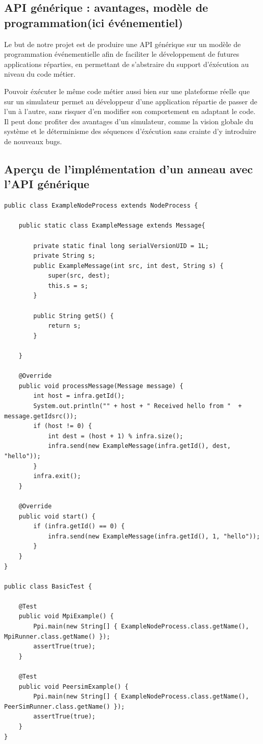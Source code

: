 \documentclass{article}
\begin{document}
			\subsection{API générique : avantages, modèle de programmation(ici événementiel)}
				Le but de notre projet est de produire une API générique sur un modèle de programmation événementielle afin de faciliter le développement de futures applications réparties, en permettant de s'abstraire du support d'éxécution au niveau du code métier. \par
Pouvoir éxécuter le même code métier aussi bien sur une plateforme réelle que sur un simulateur permet au développeur d'une application répartie de passer de l'un à l'autre, sans risquer d'en  modifier son comportement en adaptant le code. \newline Il peut donc profiter des avantages d'un simulateur, comme la vision globale du système et le déterminisme des séquences d'éxécution  sans crainte d'y introduire de nouveaux bugs. \par
 
			\newpage
			\subsection{Aperçu de l'implémentation d'un anneau avec l'API générique}
				\begin{lstlisting}
public class ExampleNodeProcess extends NodeProcess {

	public static class ExampleMessage extends Message{
	
		private static final long serialVersionUID = 1L;
		private String s;
		public ExampleMessage(int src, int dest, String s) {
			super(src, dest);
			this.s = s;
		}

		public String getS() {
			return s;
		}

	}

	@Override
	public void processMessage(Message message) {
		int host = infra.getId();
		System.out.println("" + host + " Received hello from "  + message.getIdsrc());
		if (host != 0) {
			int dest = (host + 1) % infra.size();
			infra.send(new ExampleMessage(infra.getId(), dest, "hello"));
		}
		infra.exit();
	}

	@Override
	public void start() {
		if (infra.getId() == 0) {
			infra.send(new ExampleMessage(infra.getId(), 1, "hello"));
		}
	}
}

public class BasicTest {

	@Test
	public void MpiExample() {
		Ppi.main(new String[] { ExampleNodeProcess.class.getName(), MpiRunner.class.getName() });
		assertTrue(true);
	}

	@Test
	public void PeersimExample() {
		Ppi.main(new String[] { ExampleNodeProcess.class.getName(), PeerSimRunner.class.getName() });
		assertTrue(true);
	}
}
				\end{lstlisting}
\end{document}

